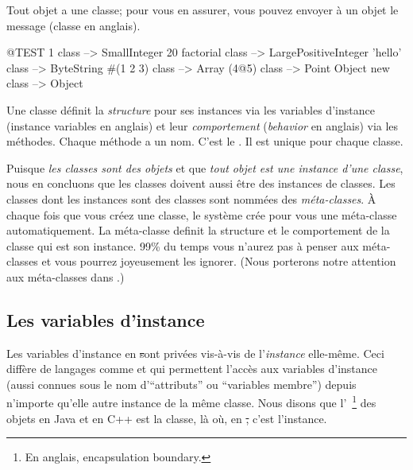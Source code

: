 \documentclass[a4paper,10pt,twoside]{book}
\begin{document}

Tout objet a une classe; pour vous en assurer, vous pouvez envoyer \`a un objet le message  (classe en anglais).

\begin{code}{@TEST}
1 class                 --> SmallInteger 
20 factorial class --> LargePositiveInteger
'hello' class          --> ByteString
#(1 2 3) class       --> Array
(4@5) class         --> Point
Object new class --> Object
\end{code}

Une classe d\'efinit la \emph{structure} pour ses instances via les variables d'instance (instance variables en anglais)
et leur \emph{comportement} (\emph{behavior} en anglais) via les m\'ethodes.
Chaque m\'ethode a un nom. C'est le . Il est unique pour chaque classe.

Puisque \emph{les classes sont des objets} et que \emph{tout objet est une instance d'une classe}, nous en concluons que les classes doivent aussi \^etre des instances de classes.
Les classes dont les instances sont des classes sont nomm\'ees des \emph{m\'eta-classes}.
\`A chaque fois que vous cr\'eez une classe, le syst\`eme cr\'ee pour vous une m\'eta-classe
automatiquement.
La m\'eta-classe definit la structure et le comportement de la classe qui est son instance.
99\% du temps vous n'aurez pas \`a penser aux m\'eta-classes et vous pourrez joyeusement les ignorer.
(Nous porterons notre attention aux m\'eta-classes dans .)

\subsection{Les variables d'instance}

Les variables d'instance en \st sont priv\'ees vis-\`a-vis de l'\emph{instance} elle-m\^eme.
Ceci diff\`ere de langages comme  et  qui permettent l'acc\`es aux variables d'instance (aussi connues sous le nom d'``attributs'' ou ``variables membre'') depuis n'importe qu'elle autre instance de la m\^eme classe.
Nous disons que l'~\footnote{En anglais, encapsulation boundary.} des objets en Java et en C++ est la classe, l\`a o\`u, en \st, c'est l'instance.
\end{document}
